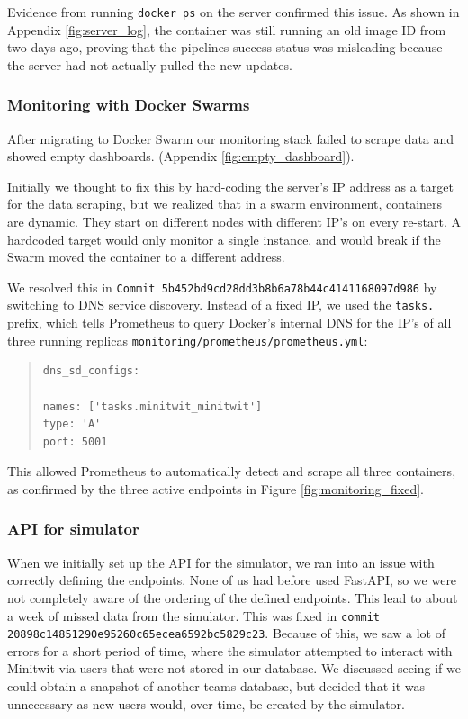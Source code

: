 \noindent Evidence from running \texttt{docker ps} on the server confirmed this issue. As shown in Appendix \ref{fig:server_log}, the container was still running an old image ID from two days ago, proving that the pipelines success status was misleading because the server had not actually pulled the new updates.\newline



\subsubsection{Monitoring with Docker Swarms}
After migrating to Docker Swarm our monitoring stack failed to scrape data and showed empty dashboards. (Appendix \ref{fig:empty_dashboard}). \newline

\noindent Initially we thought to fix this by hard-coding the server's IP address as a target for the data scraping, but we realized that in a swarm environment, containers are dynamic. They start on different nodes with different IP's on every re-start. A hardcoded target would only monitor a single instance, and would break if the Swarm moved the container to a different address.\newline

\noindent We resolved this in \texttt{Commit 5b452bd9cd28dd3b8b6a78b44c4141168097d986} by switching to DNS service discovery. Instead of a fixed IP, we used the \texttt{tasks.} prefix, which tells Prometheus to query Docker’s internal DNS for the IP's of all three running replicas \texttt{monitoring/prometheus/prometheus.yml}:

\begin{quote}
\begin{verbatim}
dns_sd_configs:

names: ['tasks.minitwit_minitwit']
type: 'A'
port: 5001
\end{verbatim}
\end{quote}

\noindent This allowed Prometheus to automatically detect and scrape all three containers, as confirmed by the three active endpoints in Figure \ref{fig:monitoring_fixed}.

\subsubsection{API for simulator}
When we initially set up the API for the simulator, we ran into an issue with correctly defining the endpoints. None of us had before used FastAPI, so we were not completely aware of the ordering of the defined endpoints. This lead to about a week of missed data from the simulator. This was fixed in \texttt{commit 20898c14851290e95260c65ecea6592bc5829c23}. Because of this, we saw a lot of errors for a short period of time, where the simulator attempted to interact with Minitwit via users that were not stored in our database. We discussed seeing if we could obtain a snapshot of another teams database, but decided that it was unnecessary as new users would, over time, be created by the simulator.





